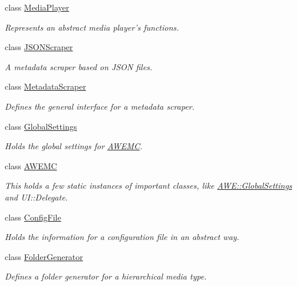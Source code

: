 \begin{DoxyCompactItemize}
class \hyperlink{class_a_w_e_1_1_media_player}{Media\-Player}
\begin{DoxyCompactList}\small\item\em Represents an abstract media player's functions. \end{DoxyCompactList}\item 
class \hyperlink{class_a_w_e_1_1_j_s_o_n_scraper}{J\-S\-O\-N\-Scraper}
\begin{DoxyCompactList}\small\item\em A metadata scraper based on J\-S\-O\-N files. \end{DoxyCompactList}\item 
class \hyperlink{class_a_w_e_1_1_metadata_scraper}{Metadata\-Scraper}
\begin{DoxyCompactList}\small\item\em Defines the general interface for a metadata scraper. \end{DoxyCompactList}\item 
class \hyperlink{class_a_w_e_1_1_global_settings}{Global\-Settings}
\begin{DoxyCompactList}\small\item\em Holds the global settings for \hyperlink{class_a_w_e_1_1_a_w_e_m_c}{A\-W\-E\-M\-C}. \end{DoxyCompactList}\item 
class \hyperlink{class_a_w_e_1_1_a_w_e_m_c}{A\-W\-E\-M\-C}
\begin{DoxyCompactList}\small\item\em This holds a few static instances of important classes, like {\ttfamily \hyperlink{class_a_w_e_1_1_global_settings}{A\-W\-E\-::\-Global\-Settings}} and {\ttfamily U\-I\-::\-Delegate}. \end{DoxyCompactList}\item 
class \hyperlink{class_a_w_e_1_1_config_file}{Config\-File}
\begin{DoxyCompactList}\small\item\em Holds the information for a configuration file in an abstract way. \end{DoxyCompactList}\item 
class \hyperlink{class_a_w_e_1_1_folder_generator}{Folder\-Generator}
\begin{DoxyCompactList}\small\item\em Defines a folder generator for a hierarchical media type. \end{DoxyCompactList}\end{DoxyCompactItemize}
